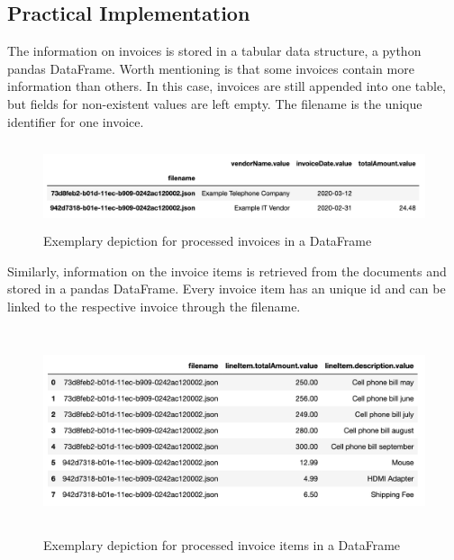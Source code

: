 	
	
    \subsection{Practical Implementation}
	
	The information on invoices is stored in a tabular data structure, a python pandas DataFrame. Worth mentioning is that some invoices contain more information than others. In this case, invoices are still appended into one table, but fields for non-existent values are left empty. The filename is the unique identifier for one invoice.
	
	\begin{figure}[ht]
		\centering
		\includegraphics[height=2.5cm]{Bilder/practical/df_invoices.png}
		\caption{Exemplary depiction for processed invoices in a DataFrame}
		\label{fig:df-invoices}
	\end{figure}

	Similarly, information on the invoice items is retrieved from the documents and stored in a pandas DataFrame. Every invoice item has an unique id and can be linked to the respective invoice through the filename.
	
	\begin{figure}[ht]
		\centering
		\includegraphics[height=6cm]{Bilder/practical/df_lineitems.png}
		\caption{Exemplary depiction for processed invoice items in a DataFrame}
		\label{fig:df-invoices}
	\end{figure}
	
